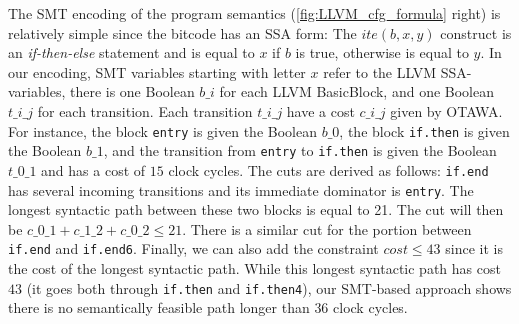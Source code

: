\documentclass[a4paper,twocolumn,11pt]{article}
\begin{document}
The SMT encoding of the program semantics (\autoref{fig:LLVM_cfg_formula} right) is relatively simple since the bitcode has an SSA form:
The $ite(b,x,y)$ construct is an \emph{if-then-else} statement and is equal to $x$ if $b$ is true, otherwise is equal to $y$. 
In our encoding, SMT variables starting with letter $x$ refer to the LLVM SSA-variables, there is one Boolean $b\_i$ for each LLVM BasicBlock, and one Boolean $t\_i\_j$ for each transition. Each transition $t\_i\_j$ have a cost $c\_i\_j$ given by \textsc{OTAWA}.
For instance, the block \texttt{entry} is given the Boolean $b\_0$, the block \texttt{if.then} is given the Boolean $b\_1$, and the transition from \texttt{entry} to \texttt{if.then} is given the Boolean $t\_0\_1$ and has a cost of $15$ clock cycles.
The cuts are derived as follows: \texttt{if.end} has several incoming transitions and its immediate dominator is \texttt{entry}. The longest syntactic path between these two blocks is equal to 21. The cut will then be $c\_0\_1 + c\_1\_2 + c\_0\_2 \leq 21$. There is a similar cut for the portion between \texttt{if.end} and \texttt{if.end6}. Finally, we can also add the constraint $cost \leq 43$ since it is the cost of the longest syntactic path.
While this longest syntactic path has cost $43$ (it goes both through \texttt{if.then} and \texttt{if.then4}), our SMT-based approach shows there is no semantically feasible path longer than $36$ clock cycles.
			  
\end{document}
